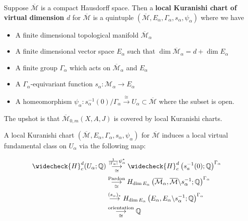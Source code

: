 \begin{definition}

Suppose $\overline{\mathcal{M}}$ is a compact Hausdorff space. Then a \textbf{local Kuranishi chart of virtual dimension $d$} for $\overline{\mathcal{M}}$ is a quintuple $(\overline{\mathcal{M}}, E_\alpha, \Gamma_\alpha, s_\alpha, \psi_\alpha)$ where we have
\begin{itemize}
\item A finite dimensional topological manifold $\overline{\mathcal{M}}_\alpha$
\item A finite dimensional vector space $E_\alpha$ such that $\dim \overline{\mathcal{M}}_\alpha = d+ \dim E_\alpha$
\item A finite group $\Gamma_\alpha$ which acts on $\overline{\mathcal{M}}_{\alpha}$ and $E_\alpha$
\item A $\Gamma_\alpha$-equivariant function $s_\alpha: \mathcal{M}_\alpha \to E_\alpha$
\item A homeomorphism $\psi_{\alpha}:s_\alpha^{-1}(0)/\Gamma_\alpha \stackrel{\cong}{\to} U_\alpha \subset \overline{\mathcal{M}}$ where the subset is open.
\end{itemize}

\end{definition}

The upshot is that $\overline{\mathcal{M}}_{0,m}(X,A,J)$ is covered by local Kuranishi charts.

A local Kuranishi chart $(\overline{\mathcal{M}}, E_\alpha, \Gamma_\alpha, s_\alpha, \psi_\alpha)$ for $\overline{\mathcal{M}}$ induces a local virtual fundamental class on $U_\alpha$ via the following map:

\begin{align*}
\widecheck{H}_c^d (U_\alpha; \mathbb{Q}) &\overset{\frac{1}{|\Gamma_a|}\psi_\alpha^*}{\underset{\cong}{\longrightarrow}} \widecheck{H}_c^d \left(s_a^{-1}(0); \mathbb{Q} \right)^{\Gamma_\alpha} \\
& \overset{\text{Pardon}}{\underset{\cong}{\longrightarrow}} H_{\dim E_\alpha} \left(\overline{\mathcal{M}}_\alpha, \overline{\mathcal{M}}\backslash s_\alpha^{-1}; \mathbb{Q}\right)^{\Gamma_\alpha} \\
&\stackrel{(s_\alpha)_*}{\longrightarrow} H_{\dim E_\alpha} \left(E_\alpha, E_\alpha\backslash s_\alpha^{-1}; \mathbb{Q}\right)^{\Gamma_\alpha} \\
&\overset{\text{orientation}}{\underset{\cong}{\longrightarrow}} \mathbb{Q}
\end{align*}


